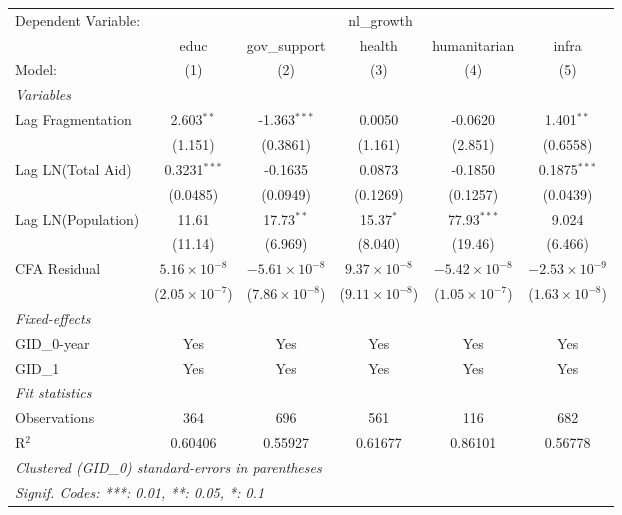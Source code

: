 \begingroup
\centering
\begin{tabular}{lccccc}
   \tabularnewline \midrule \midrule
   Dependent Variable: & \multicolumn{5}{c}{nl\_growth}\\
                      & educ                    & gov\_support            & health                  & humanitarian            & infra \\   
   Model:             & (1)                     & (2)                     & (3)                     & (4)                     & (5)\\  
   \midrule
   \emph{Variables}\\
   Lag Fragmentation  & 2.603$^{**}$            & -1.363$^{***}$          & 0.0050                  & -0.0620                 & 1.401$^{**}$\\   
                      & (1.151)                 & (0.3861)                & (1.161)                 & (2.851)                 & (0.6558)\\   
   Lag LN(Total Aid)  & 0.3231$^{***}$          & -0.1635                 & 0.0873                  & -0.1850                 & 0.1875$^{***}$\\   
                      & (0.0485)                & (0.0949)                & (0.1269)                & (0.1257)                & (0.0439)\\   
   Lag LN(Population) & 11.61                   & 17.73$^{**}$            & 15.37$^{*}$             & 77.93$^{***}$           & 9.024\\   
                      & (11.14)                 & (6.969)                 & (8.040)                 & (19.46)                 & (6.466)\\   
   CFA Residual       & $5.16\times 10^{-8}$    & $-5.61\times 10^{-8}$   & $9.37\times 10^{-8}$    & $-5.42\times 10^{-8}$   & $-2.53\times 10^{-9}$\\    
                      & ($2.05\times 10^{-7}$)  & ($7.86\times 10^{-8}$)  & ($9.11\times 10^{-8}$)  & ($1.05\times 10^{-7}$)  & ($1.63\times 10^{-8}$)\\    
   \midrule
   \emph{Fixed-effects}\\
   GID\_0-year        & Yes                     & Yes                     & Yes                     & Yes                     & Yes\\  
   GID\_1             & Yes                     & Yes                     & Yes                     & Yes                     & Yes\\  
   \midrule
   \emph{Fit statistics}\\
   Observations       & 364                     & 696                     & 561                     & 116                     & 682\\  
   R$^2$              & 0.60406                 & 0.55927                 & 0.61677                 & 0.86101                 & 0.56778\\  
   \midrule \midrule
   \multicolumn{6}{l}{\emph{Clustered (GID\_0) standard-errors in parentheses}}\\
   \multicolumn{6}{l}{\emph{Signif. Codes: ***: 0.01, **: 0.05, *: 0.1}}\\
\end{tabular}
